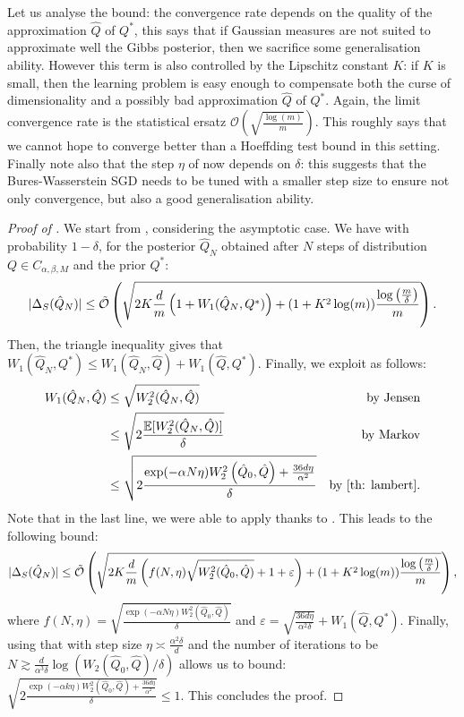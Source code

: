 Let us analyse the bound: the convergence rate depends on the quality of the approximation $\hat{Q}$ of $Q^*$, this says that if Gaussian measures are not suited to approximate well the Gibbs posterior, then we sacrifice some generalisation ability. However this term is also controlled by the Lipschitz constant $K$: if $K$ is small, then the learning problem is easy enough to compensate both the curse of dimensionality and a possibly bad approximation $\hat{Q}$ of $Q^*$.
Again, the limit convergence rate is the statistical ersatz $\mathcal{O}\left( \sqrt{\frac{\log(m)}{m}} \right)$. This roughly says that we cannot hope to converge better than a Hoeffding test bound in this setting. Finally note also that the step $\eta$ of  now depends on $\delta$: this suggests that the Bures-Wasserstein SGD needs to be tuned with a smaller step size to ensure not only convergence, but also a good generalisation ability.
\begin{proof}[Proof of ]
We start from , considering the asymptotic case. We have with probability $1-\delta$, for the posterior $\hat{Q}_N$ obtained after $N$ steps of  distribution $Q\in C_{\alpha,\beta,M}$ and the prior $Q^*$:
\begin{align*}
|\Delta_S(\hat{Q}_N)|  \leq\Tilde{\mathcal{O}}\left( \sqrt{2K\frac{d}{m}\left(1 + W_1(\hat{Q}_N,Q^*)\right)+ (1+K^2\log(m))\frac{\log\left( \frac{m}{\delta} \right)}{m}}   \right).
\end{align*}
Then, the triangle inequality gives that $W_1(\hat{Q}_N,Q^*) \leq W_1(\hat{Q}_N,\hat{Q}) + W_1(\hat{Q},Q^*)$.
Finally, we exploit  as follows:
\begin{align*}
W_1(\hat{Q}_N,\hat{Q}) & \leq \sqrt{W_2^2(\hat{Q}_N,\hat{Q})} & \text{by Jensen} \\
& \leq \sqrt{2\frac{\mathbb{E}[W_2^2(\hat{Q}_N,\hat{Q})]}{\delta}} & \text{by Markov}\\
& \leq \sqrt{2\frac{\exp (-\alpha N \eta) W_2^2\left(\hat{Q}_0, \hat{Q}\right)+\frac{36 d \eta}{\alpha^2}}{\delta}} & \text{by \Cref{th: lambert}.}
\end{align*}
Note that in the last line, we were able to apply  thanks to .
This leads to the following bound:
\begin{equation}
\label{eq: complete_bound_sgd}
|\Delta_S(\hat{Q}_N)|  \leq \Tilde{\mathcal{O}}\left( \sqrt{2K\frac{d}{m}\left( f(N,\eta)\sqrt{W_2^2(\hat{Q}_0,\hat{Q})} + 1 +
\varepsilon \right)+ (1+K^2\log(m))\frac{\log\left( \frac{m}{\delta} \right)}{m}}   \right),
\end{equation}
where $f(N,\eta)= \sqrt{\frac{\exp (-\alpha N \eta) W_2^2\left(\hat{Q}_0, \hat{Q}\right)}{\delta}}$ and $\varepsilon= \sqrt{\frac{36 d \eta}{\alpha^2\delta}} + W_1(\hat{Q},Q^*)$.
Finally, using that with step size $\eta \asymp \frac{\alpha^2 \delta}{d}$ and the number of iterations to be $N \gtrsim \frac{d}{\alpha^3 \delta} \log \left(W_2\left(\hat{Q}_0, \hat{Q}\right) / \delta\right)$ allows us to bound:
$\sqrt{2\frac{\exp (-\alpha k \eta) W_2^2\left(\hat{Q}_0, \hat{Q}\right)+\frac{36 d \eta}{\alpha^2}}{\delta}} \leq 1$.
This concludes the proof.
\end{proof}


